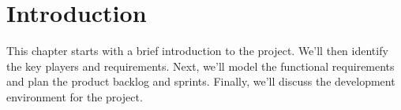 \section*{Introduction}

This chapter starts with a brief introduction to the project. We’ll then identify the key players and requirements. Next, we’ll model the functional requirements and plan the product backlog and sprints. Finally, we’ll discuss the development environment for the project.
